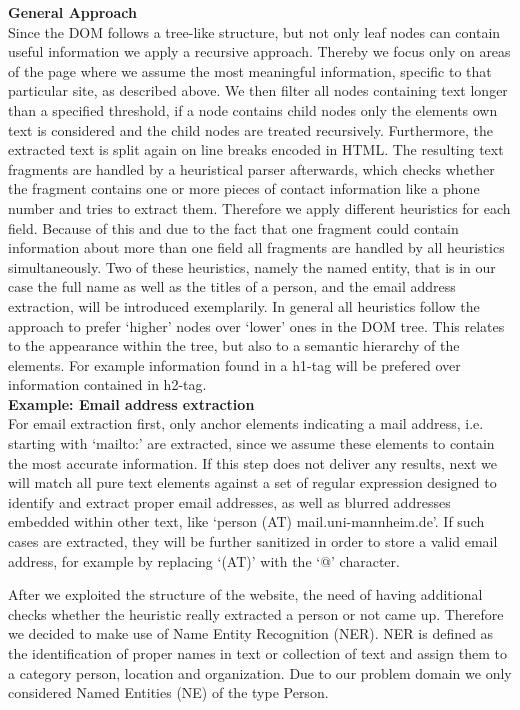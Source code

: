 \documentclass[11pt,titlepage,oneside,openany]{article}
\begin{document}
\textbf{General Approach}\\
Since the DOM follows a tree-like structure, but not only leaf nodes can contain useful information we apply a recursive approach. Thereby we focus only on areas of the page where we assume the most meaningful information, specific to that particular site, as described above. We then filter all nodes containing text longer than a specified threshold, if a node contains child nodes only the elements own text is considered and the child nodes are treated recursively. Furthermore, the extracted text is split again on line breaks encoded in HTML. The resulting text fragments are handled by a heuristical parser afterwards, which checks whether the  fragment contains one or more pieces of contact information like a phone number and tries to extract them. Therefore we apply different heuristics for each field. Because of this and due to the fact that one fragment could contain information about more than one field all fragments are handled by all heuristics simultaneously. Two of these heuristics, namely the named entity, that is in our case the full name as well as the titles of a person, and the email address extraction, will be introduced exemplarily. In general all heuristics follow the approach to prefer ‘higher’ nodes over ‘lower’ ones in the DOM tree. This relates to the appearance within the tree, but also to a semantic hierarchy of the elements. For example information found in a h1-tag will be prefered over information contained in h2-tag.\\


\textbf{Example: Email address extraction}\\
For email extraction first, only anchor elements indicating a mail address, i.e. starting with ‘mailto:’ are extracted, since we assume these elements to contain the most accurate information. If this step does not deliver any results, next we will match all pure text elements against a set of regular expression designed to identify and extract proper email addresses, as well as blurred addresses embedded within other text, like ‘person (AT) mail.uni-mannheim.de’. If such cases are extracted, they will be further sanitized in order to store a valid email address, for example by replacing ‘(AT)’ with the ‘@’ character. 

After we exploited the structure of the website, the need of having additional checks whether the heuristic really extracted a person or not came up. Therefore we decided to make use of Name Entity Recognition (NER). NER is defined as the identification of proper names in text or collection of text and assign them to a category person, location and organization. Due to our problem domain we only considered Named Entities (NE) of the type Person. 
\end{document}
